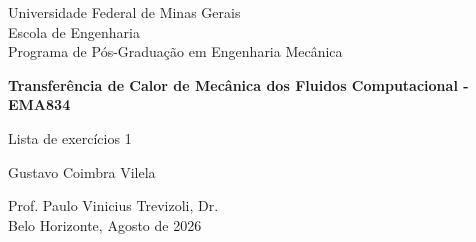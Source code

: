 \begin{titlepage}
\begin{center}
{\large Universidade Federal de Minas Gerais\\
Escola de Engenharia \\
Programa de Pós-Graduação em Engenharia Mecânica\\}

\vspace{6cm}
{\bf\Large Transferência de Calor de Mecânica dos Fluidos Computacional - EMA834\vspace{1.0cm}

Lista de exercícios 1}
\vspace{4cm}

{\large Gustavo Coimbra Vilela}
\vspace{2cm}  
   
\vspace{2cm}          
{\large Prof. Paulo Vinicius Trevizoli, Dr.}\\


\vfill
{\large Belo Horizonte, Agosto de 2026 }
\end{center}

\end{titlepage}